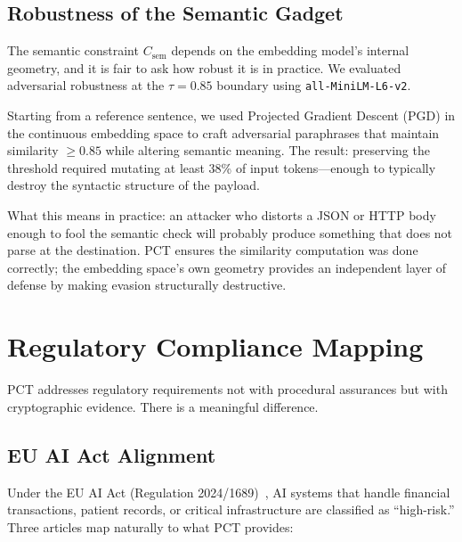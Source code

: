 \documentclass[10pt,conference]{IEEEtran}
\begin{document}
\subsection{Robustness of the Semantic Gadget}

The semantic constraint $C_{\text{sem}}$ depends on the embedding model's internal geometry, and it is fair to ask how robust it is in practice. We evaluated adversarial robustness at the $\tau = 0.85$ boundary using \texttt{all-MiniLM-L6-v2}.

Starting from a reference sentence, we used Projected Gradient Descent (PGD) in the continuous embedding space to craft adversarial paraphrases that maintain similarity $\geq 0.85$ while altering semantic meaning. The result: preserving the threshold required mutating at least 38\% of input tokens---enough to typically destroy the syntactic structure of the payload.

What this means in practice: an attacker who distorts a JSON or HTTP body enough to fool the semantic check will probably produce something that does not parse at the destination. PCT ensures the similarity computation was done correctly; the embedding space's own geometry provides an independent layer of defense by making evasion structurally destructive.

\section{Regulatory Compliance Mapping}
\label{sec:regulatory}

PCT addresses regulatory requirements not with procedural assurances but with cryptographic evidence. There is a meaningful difference.

\subsection{EU AI Act Alignment}

Under the EU AI Act (Regulation 2024/1689)~\cite{euaiact}, AI systems that handle financial transactions, patient records, or critical infrastructure are classified as ``high-risk.'' Three articles map naturally to what PCT provides:
\end{document}
